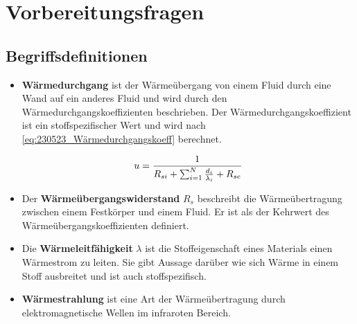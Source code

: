 \section{Vorbereitungsfragen}
\subsection{Begriffsdefinitionen}

\begin{itemize}
\item \textbf{Wärmedurchgang} ist der Wärmeübergang von einem Fluid durch eine Wand auf ein anderes Fluid und wird durch den Wärmedurchgangskoeffizienten beschrieben. Der Wärmedurchgangskoeffizient ist ein stoffspezifischer Wert und wird nach \autoref{eq:230523_Wärmedurchgangskoeff} berechnet. 
 
\begin{equation}
	\centering
	u=\frac{1}{R_{si}+\sum_{i=1}^N \frac{d_i}{\lambda_i}+R_{se}}
	\label{eq:230523_Wärmedurchgangskoeff}
\end{equation}

\item Der \textbf{Wärmeübergangswiderstand} $R_s$ beschreibt die Wärmeübertragung zwischen einem Festkörper und einem Fluid. Er ist als der Kehrwert des Wärmeübergangskoeffizienten definiert.

\item Die \textbf{Wärmeleitfähigkeit} $\lambda$ ist die Stoffeigenschaft eines Materials einen Wärmestrom zu leiten. Sie gibt Aussage darüber wie sich Wärme in einem Stoff ausbreitet und ist auch stoffspezifisch.

\item \textbf{Wärmestrahlung} ist eine Art der Wärmeübertragung durch elektromagnetische Wellen im infraroten Bereich.

\end{itemize}


